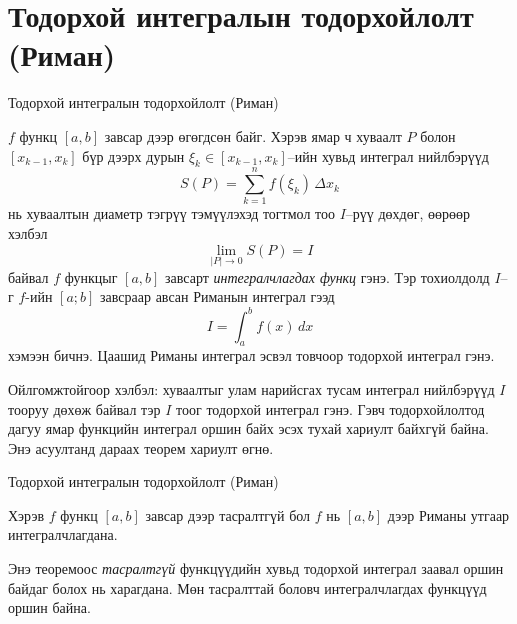 \section{Тодорхой интегралын тодорхойлолт (Риман)}
\begin{frame}[allowframebreaks]{Тодорхой интегралын тодорхойлолт (Риман)}
\begin{definition}
$f$ функц $[a,b]$ завсар дээр өгөгдсөн байг. Хэрэв
ямар ч хуваалт $P$ болон $[x_{k-1},x_k]$ бүр дээрх дурын $\xi_k\in[x_{k-1},x_k]$–ийн хувьд интеграл нийлбэрүүд
\[
S(P) = \sum_{k=1}^n f(\xi_k)\,\Delta x_k
\]
нь хуваалтын диаметр тэгрүү тэмүүлэхэд тогтмол тоо $I$–рүү дөхдөг, өөрөөр хэлбэл
\[
\lim\limits_{|P|\to 0} S(P)=I
\]
байвал $f$ функцыг $[a,b]$ завсарт \emph{интегралчлагдах функц} гэнэ.
Тэр тохиолдолд $I$–г $f$-ийн $[a;b]$ завсраар авсан  Риманын интеграл гээд
\[
I = \int_a^b f(x)\,dx
\]
хэмээн бичнэ. Цаашид Риманы интеграл эсвэл товчоор тодорхой интеграл гэнэ.
\end{definition}

Ойлгомжтойгоор хэлбэл: хуваалтыг улам нарийсгах тусам интеграл нийлбэрүүд
$I$ тооруу дөхөж байвал тэр $I$ тоог тодорхой интеграл гэнэ. Гэвч тодорхойлолтод дагуу ямар функцийн интеграл оршин байх эсэх тухай хариулт байхгүй байна. Энэ асуултанд дараах теорем хариулт өгнө.  
\end{frame}

\begin{frame}[allowframebreaks]{Тодорхой интегралын тодорхойлолт (Риман)}
\begin{theorem}
Хэрэв $f$ функц $[a,b]$ завсар дээр тасралтгүй бол
$f$ нь $[a,b]$ дээр Риманы утгаар интегралчлагдана.
\end{theorem}

Энэ теоремоос \emph{тасралтгүй} функцүүдийн хувьд тодорхой интеграл заавал оршин байдаг болох нь харагдана. Мөн тасралттай боловч интегралчлагдах функцүүд оршин байна.
\end{frame}

